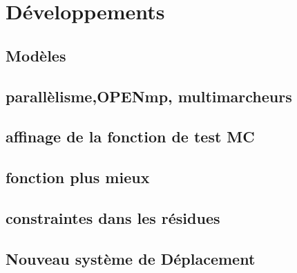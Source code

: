 \chapter{Développements}
\label{chap:developpements}

\section{Modèles}

\section{parallèlisme,OPENmp, multimarcheurs}

\section{affinage de la fonction de test MC}
\section{fonction plus mieux}
\section{constraintes dans les résidues}
\section{Nouveau système de Déplacement}

\clearpage


